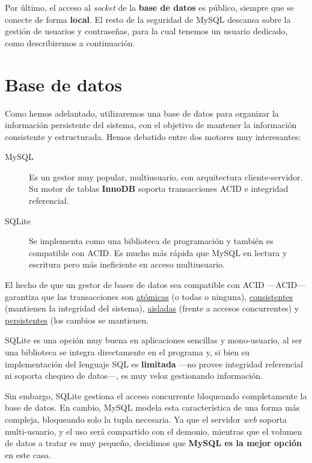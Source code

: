 Por último, el acceso al \textit{socket} de la \textbf{base de datos} es público, siempre que se conecte de forma \textbf{local}. El resto de la seguridad de MySQL descansa sobre la gestión de usuarios y contraseñas, para la cual tenemos un usuario dedicado, como describiremos a continuación.

\newpage

\section{Base de datos}

Como hemos adelantado, utilizaremos una base de datos para organizar la información persistente del sistema, con el objetivo de mantener la información consistente y estructurada. Hemos debatido entre dos motores muy interesantes:

\begin{description}
	\item[MySQL] Es un gestor muy popular, multiusuario, con arquitectura cliente-servidor. Su motor de tablas \textbf{InnoDB} soporta transacciones \acrshort{ACID} e integridad referencial. \cite{wiki_innodb}
	
	\item[SQLite] Se implementa como una biblioteca de programación y también es compatible con \acrshort{ACID}. Es mucho más rápida que MySQL en lectura y escritura pero más ineficiente en acceso multiusuario.
\end{description}

El hecho de que un gestor de bases de datos sea compatible con \acrshort{ACID} ---\acrlong{ACID}--- garantiza que las transacciones son \underline{atómicas} (o todas o ninguna), \underline{consistentes} (mantienen la integridad del sistema), \underline{aisladas} (frente a accesos concurrentes) y \underline{persistentes} (los cambios se mantienen. \cite{wiki_acid}

SQLite es una opción muy buena en aplicaciones sencillas y mono-usuario, al ser una biblioteca se integra directamente en el programa y, si bien su implementación del lenguaje \acrshort{SQL} es \textbf{limitada} ---no provee integridad referencial ni soporta chequeo de datos---, es muy veloz gestionando información.

Sin embargo, SQLite gestiona el acceso concurrente bloqueando completamente la base de datos. En cambio, MySQL modela esta característica de una forma más compleja, bloqueando solo la tupla necesaria. Ya que el servidor \textit{web} soporta multi-usuario, y el uso será compartido con el demonio, mientras que el volumen de datos a tratar es muy pequeño, decidimos que \textbf{MySQL es la mejor opción} en este caso.

